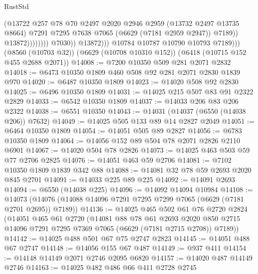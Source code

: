 \begin{lexlean}{RustStd}
\begin{coremodule}
                                      (@13722
                                        @257
                                        @78
                                        @70
                                        @2497
                                        @2020
                                        @2946
                                        @2959
                                        (@13732 @2497 @13735 @8664)
                                        @7291
                                        @7295
                                        @7638
                                        @7065
                                        (@6629 (@7181 @2959 @2947))
                                        @7189))
                                    @13872))))))))
                    @7030))
                @13872)))
          @10784
          @10787
          @10790
          @10793
          @7189)))
    (@8560 (@10703 @32))
    (@6629 (@10708 @10310 @152))
    (@6418 (@10715 @152 @455 @2688 @2071))
@14008 := @7200 @10350 @509 @281 @2071 @2832
@14018 := @6473 @10350 @1809 @460 @508 @92 @281 @2071 @2830 @1839 @970
@14020 := @6487 @10350 @1809
@14023 := @14020 @508 @92 @2830
@14025 := @6496 @10350 @1809
@14031 := @14025 @215 @507 @83 @91 @2322 @2829
@14033 := @6542 @10350 @1809
@14037 := @14033 @206 @83 @206 @2322
@14038 := @6551 @10350
@14043 := @14031 (@14037 (@6550 (@14038 @206)) @7632)
@14049 := @14025 @505 @133 @89 @14 @2827 @2049
@14051 := @6464 @10350 @1809
@14054 := @14051 @505 @89 @2827
@14056 := @6783 @10350 @1809
@14064 := @14056 @152 @89 @504 @78 @2071 @2826 @2110 @6901
@14067 := @14020 @504 @78 @2826
@14073 := @14025 @463 @503 @59 @77 @2706 @2825
@14076 := @14051 @463 @59 @2706
@14081 := @7102 @10350 @1809 @1839 @342 @88
@14088 := @14081 @32 @78 @59 @2693 @2020 @845 @2701
@14091 := @14033 @225 @89 @225
@14092 := @14091 @2693
@14094 := @6550 (@14038 @225)
@14096 := @14092 @14094 @10984
@14108 := @14073 (@14076 (@14088 @14096 @7291 @7295 @7299 @7065 (@6629 (@7181 @2701 @2695)) @7189))
@14136 := @14025
    @465
    @502
    @61
    @76
    @2720
    @2824
    (@14051
      @465
      @61
      @2720
      (@14081
        @88
        @78
        @61
        @2693
        @2020
        @850
        @2715
        @14096
        @7291
        @7295
        @7369
        @7065
        (@6629 (@7181 @2715 @2708))
        @7189))
@14142 := @14025 @488 @501 @67 @75 @2747 @2823
@14145 := @14051 @488 @67 @2747
@14148 := @14056 @155 @67 @487
@14149 := @937 @411
@14154 := @14148 @14149 @2071 @2746 @2095 @6820
@14157 := @14020 @487 @14149 @2746
@14163 := @14025 @482 @486 @66 @411 @2728 @2745

\end{coremodule}
\end{lexlean}
